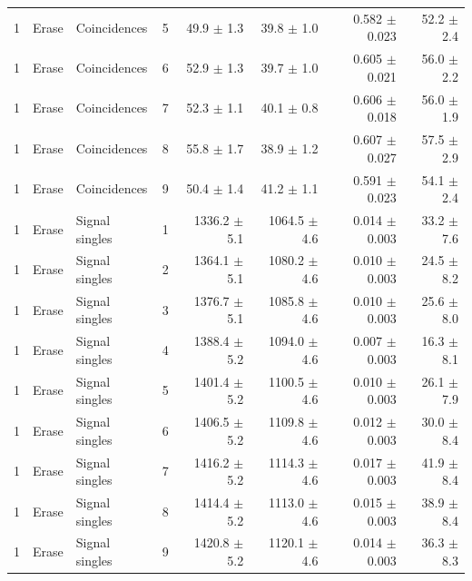 \begin{tabular}{llllrrrr}
1 & Erase & Coincidences & 5 & 49.9 \ensuremath{\pm} 1.3 & 39.8 \ensuremath{\pm} 1.0 & 0.582 \ensuremath{\pm} 0.023 & 52.2 \ensuremath{\pm} 2.4 \\
1 & Erase & Coincidences & 6 & 52.9 \ensuremath{\pm} 1.3 & 39.7 \ensuremath{\pm} 1.0 & 0.605 \ensuremath{\pm} 0.021 & 56.0 \ensuremath{\pm} 2.2 \\
1 & Erase & Coincidences & 7 & 52.3 \ensuremath{\pm} 1.1 & 40.1 \ensuremath{\pm} 0.8 & 0.606 \ensuremath{\pm} 0.018 & 56.0 \ensuremath{\pm} 1.9 \\
1 & Erase & Coincidences & 8 & 55.8 \ensuremath{\pm} 1.7 & 38.9 \ensuremath{\pm} 1.2 & 0.607 \ensuremath{\pm} 0.027 & 57.5 \ensuremath{\pm} 2.9 \\
1 & Erase & Coincidences & 9 & 50.4 \ensuremath{\pm} 1.4 & 41.2 \ensuremath{\pm} 1.1 & 0.591 \ensuremath{\pm} 0.023 & 54.1 \ensuremath{\pm} 2.4 \\
\midrule
1 & Erase & Signal singles & 1 & 1336.2 \ensuremath{\pm} 5.1 & 1064.5 \ensuremath{\pm} 4.6 & 0.014 \ensuremath{\pm} 0.003 & 33.2 \ensuremath{\pm} 7.6 \\
1 & Erase & Signal singles & 2 & 1364.1 \ensuremath{\pm} 5.1 & 1080.2 \ensuremath{\pm} 4.6 & 0.010 \ensuremath{\pm} 0.003 & 24.5 \ensuremath{\pm} 8.2 \\
1 & Erase & Signal singles & 3 & 1376.7 \ensuremath{\pm} 5.1 & 1085.8 \ensuremath{\pm} 4.6 & 0.010 \ensuremath{\pm} 0.003 & 25.6 \ensuremath{\pm} 8.0 \\
1 & Erase & Signal singles & 4 & 1388.4 \ensuremath{\pm} 5.2 & 1094.0 \ensuremath{\pm} 4.6 & 0.007 \ensuremath{\pm} 0.003 & 16.3 \ensuremath{\pm} 8.1 \\
1 & Erase & Signal singles & 5 & 1401.4 \ensuremath{\pm} 5.2 & 1100.5 \ensuremath{\pm} 4.6 & 0.010 \ensuremath{\pm} 0.003 & 26.1 \ensuremath{\pm} 7.9 \\
1 & Erase & Signal singles & 6 & 1406.5 \ensuremath{\pm} 5.2 & 1109.8 \ensuremath{\pm} 4.6 & 0.012 \ensuremath{\pm} 0.003 & 30.0 \ensuremath{\pm} 8.4 \\
1 & Erase & Signal singles & 7 & 1416.2 \ensuremath{\pm} 5.2 & 1114.3 \ensuremath{\pm} 4.6 & 0.017 \ensuremath{\pm} 0.003 & 41.9 \ensuremath{\pm} 8.4 \\
1 & Erase & Signal singles & 8 & 1414.4 \ensuremath{\pm} 5.2 & 1113.0 \ensuremath{\pm} 4.6 & 0.015 \ensuremath{\pm} 0.003 & 38.9 \ensuremath{\pm} 8.4 \\
1 & Erase & Signal singles & 9 & 1420.8 \ensuremath{\pm} 5.2 & 1120.1 \ensuremath{\pm} 4.6 & 0.014 \ensuremath{\pm} 0.003 & 36.3 \ensuremath{\pm} 8.3 \\
\bottomrule
\end{tabular}
